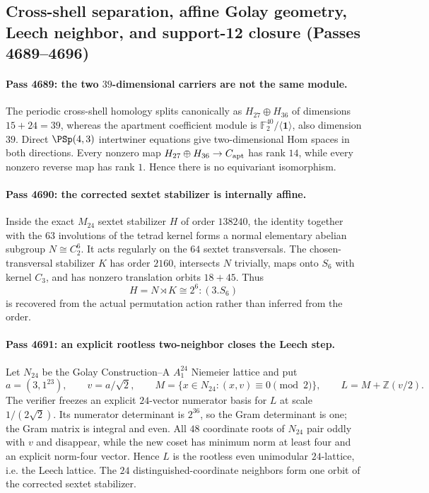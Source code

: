 \subsection{Cross-shell separation, affine Golay geometry, Leech neighbor, and support-12 closure (Passes 4689--4696)}
\label{sec:pass4689-4696-homology-affine-leech-c8-support12}

\paragraph{Pass 4689: the two $39$-dimensional carriers are not the same module.}
The periodic cross-shell homology splits canonically as $H_{27}\oplus H_{36}$ of dimensions $15+24=39$, whereas the apartment coefficient module is $\mathbb F_2^{40}/\langle\mathbf 1\rangle$, also dimension $39$.  Direct $\PSp(4,3)$ intertwiner equations give two-dimensional Hom spaces in both directions.  Every nonzero map $H_{27}\oplus H_{36}\to C_{\rm apt}$ has rank $14$, while every nonzero reverse map has rank $1$.  Hence there is no equivariant isomorphism.

\paragraph{Pass 4690: the corrected sextet stabilizer is internally affine.}
Inside the exact $M_{24}$ sextet stabilizer $H$ of order $138240$, the identity together with the $63$ involutions of the tetrad kernel forms a normal elementary abelian subgroup $N\cong C_2^6$.  It acts regularly on the $64$ sextet transversals.  The chosen-transversal stabilizer $K$ has order $2160$, intersects $N$ trivially, maps onto $S_6$ with kernel $C_3$, and has nonzero translation orbits $18+45$.  Thus
\[
 H=N\rtimes K\cong 2^6\!:\!(3.S_6)
\]
is recovered from the actual permutation action rather than inferred from the order.

\paragraph{Pass 4691: an explicit rootless two-neighbor closes the Leech step.}
Let $N_{24}$ be the Golay Construction--A $A_1^{24}$ Niemeier lattice and put
\[
 a=(3,1^{23}),\qquad v=a/\sqrt2,\qquad M=\{x\in N_{24}:(x,v)\equiv0\pmod2\},\qquad L=M+\mathbb Z(v/2).
\]
The verifier freezes an explicit $24$-vector numerator basis for $L$ at scale $1/(2\sqrt2)$.  Its numerator determinant is $2^{36}$, so the Gram determinant is one; the Gram matrix is integral and even.  All $48$ coordinate roots of $N_{24}$ pair oddly with $v$ and disappear, while the new coset has minimum norm at least four and an explicit norm-four vector.  Hence $L$ is the rootless even unimodular $24$-lattice, i.e. the Leech lattice.  The $24$ distinguished-coordinate neighbors form one orbit of the corrected sextet stabilizer.

